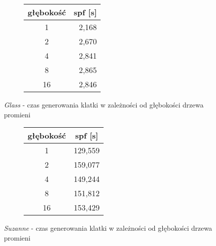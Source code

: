 \begin{figure}[H]
\begin{subfigure}{.5\textwidth}
\end{subfigure}
\begin{subfigure}{.5\textwidth}
		\caption{Tabla z wynikami}
		\begin{longtable}{|c|r|} \hline
	    głębokość & \multicolumn{1}{|c|}{spf [s]} \\ \hline
		1 & 2,168 \\
		2 & 2,670 \\
		4 & 2,841 \\
		8 & 2,865 \\
		16 & 2,846 \\
		\hline
		\end{longtable}
\end{subfigure}
\caption{\emph{Glass} - czas generowania klatki w zależności od głębokości drzewa promieni}
\end{figure}
%
\begin{figure}[H]
\begin{subfigure}{.5\textwidth}
\end{subfigure}
\begin{subfigure}{.5\textwidth}
		\caption{Tabla z wynikami}
		\begin{longtable}{|c|r|} \hline
	    głębokość & \multicolumn{1}{|c|}{spf [s]} \\ \hline
		1 & 129,559 \\
		2 & 159,077 \\
		4 & 149,244 \\
		8 & 151,812 \\
		16 & 153,429 \\
		\hline
		\end{longtable}
\end{subfigure}
\vspace*{-2mm}
\caption{\emph{Suzanne} - czas generowania klatki w zależności od głębokości drzewa promieni}
\end{figure}
